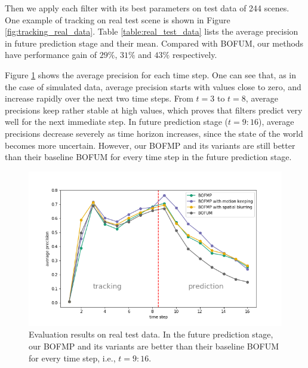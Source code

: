 Then we apply each filter with its best parameters on test data of 244 scenes. One example of tracking on real test scene is shown in Figure \ref{fig:tracking_real_data}. Table \ref{table:real_test_data} lists the average precision in future prediction stage and their mean. Compared with BOFUM, our methods have performance gain of $29\%$, $31\%$ and $43\%$ respectively. 

Figure \ref{fig:real_test_data} shows the average precision for each time step. One can see that, as in the case of simulated data, average precision starts with values close to zero, and increase rapidly over the next two time steps. From $t=3$ to $t=8$, average precisions keep rather stable at high values, which proves that filters predict very well for the next immediate step. In future prediction stage ($t=9:16$), average precisions decrease severely as time horizon increases, since the state of the world becomes more uncertain. However, our BOFMP and its variants are still better than their baseline BOFUM for every time step in the future prediction stage.

\begin{figure}[ht]
  \centering

    \includegraphics[width=.8\textwidth]{figures/test_on_real_data.png}
    \caption[[Evaluation results on real test data. ]{Evaluation results on real test data. In the future prediction stage, our BOFMP and its variants are better than their baseline BOFUM for every time step, i.e., $t=9:16$.}
    \label{fig:real_test_data}

\end{figure}





